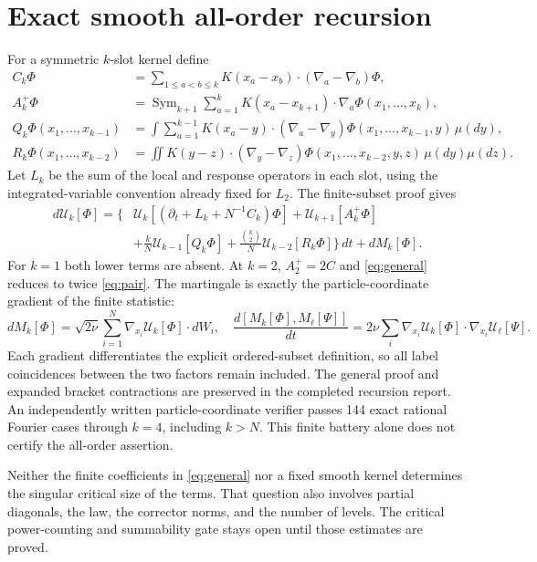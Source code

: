 \documentclass[11pt]{article}
\newcommand{\U}{\mathcal U}
\begin{document}
\section{Exact smooth all-order recursion}
For a symmetric $k$-slot kernel define
\begin{align*}
 C_k\Phi&=\sum_{1\le a<b\le k}K(x_a-x_b)\cdot(\nabla_a-\nabla_b)\Phi,\\
 A_k^+\Phi&=\operatorname{Sym}_{k+1}\sum_{a=1}^k
 K(x_a-x_{k+1})\cdot\nabla_a\Phi(x_1,\ldots,x_k),\\
 Q_k\Phi(x_1,\ldots,x_{k-1})&=\int\sum_{a=1}^{k-1}
 K(x_a-y)\cdot(\nabla_a-\nabla_y)\Phi(x_1,\ldots,x_{k-1},y)\,\mu(dy),\\
 R_k\Phi(x_1,\ldots,x_{k-2})&=\iint K(y-z)\cdot(\nabla_y-\nabla_z)
 \Phi(x_1,\ldots,x_{k-2},y,z)\,\mu(dy)\mu(dz).
\end{align*}
Let $L_k$ be the sum of the local and response operators in each slot,
using the integrated-variable convention already fixed for $L_2$.
The finite-subset proof gives
\begin{equation}\label{eq:general}
\begin{split}
 d\U_k[\Phi]=\bigg\{&\U_k[(\partial_t+L_k+N^{-1}C_k)\Phi]
 +\U_{k+1}[A_k^+\Phi]\\
 &+\frac{k}{N}\U_{k-1}[Q_k\Phi]
 +\frac{\binom{k}{2}}{N}\U_{k-2}[R_k\Phi]\bigg\}\,dt+dM_k[\Phi].
\end{split}
\end{equation}
For $k=1$ both lower terms are absent. At $k=2$, $A_2^+=2C$
and \eqref{eq:general} reduces to twice \eqref{eq:pair}.
The martingale is exactly the particle-coordinate gradient of the
finite statistic:
\[
 dM_k[\Phi]=\sqrt{2\nu}\sum_{i=1}^N\nabla_{x_i}\U_k[\Phi]\cdot dW_i,
 \quad
 \frac{d[M_k[\Phi],M_\ell[\Psi]]}{dt}
 =2\nu\sum_i\nabla_{x_i}\U_k[\Phi]\cdot\nabla_{x_i}\U_\ell[\Psi].
\]
Each gradient differentiates the explicit ordered-subset definition,
so all label coincidences between the two factors remain included.
The general proof and expanded bracket contractions are preserved in the
completed recursion report. An independently written particle-coordinate
verifier passes 144 exact rational Fourier cases through $k=4$, including
$k>N$. This finite battery alone does not certify the all-order assertion.

Neither the finite coefficients in \eqref{eq:general} nor a fixed smooth
kernel determines the singular critical size of the terms. That question
also involves partial diagonals, the law, the corrector norms, and the
number of levels. The critical power-counting and summability gate stays
open until those estimates are proved.
\end{document}
